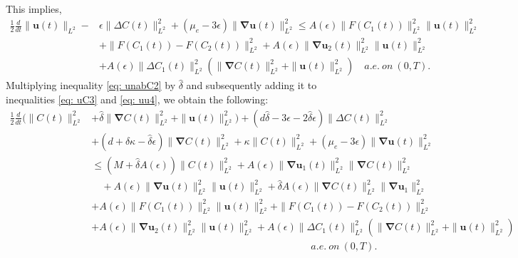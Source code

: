 \documentclass[final,3p,times]{elsarticle}
\theoremstyle{plain}
\theoremstyle{remark}
\theoremstyle{plain}
\theoremstyle{remark}
\begin{document}
This implies,
\begin{align}
      \frac{ 1}{2}\frac{d}{dt}\| \mathbf  u\left(t\right)\|_{L^2}- &\epsilon \|\Delta C\left(t\right)\|_{L^2}^2+\left(\mu _e-3\epsilon\right) \|\boldsymbol{\nabla}\mathbf{u}\left(t\right)\|^2_{L^2}\le A\left(\epsilon\right)\|F\left(C_1\left(t\right)\right)\|^2_{L^2}\|\mathbf u\left(t\right)\|_{L^2}^2\nonumber\\& + 
    \|F\left(C_1\left(t\right)\right)-F\left(C_2\left(t\right)\right)\|^2_{L^2}+A\left(\epsilon\right)\|\boldsymbol{\nabla}\mathbf u_2\left(t\right)\|^2_{L^2}\|\mathbf u\left(t\right)\|^2_{L^2}\nonumber\\&+A\left(\epsilon\right) \|\Delta C_1\left(t\right)\|_{L^2}^2 \left( \|\boldsymbol{\nabla} C\left(t\right)\|_{L^2}^2 + \|\mathbf{u}\left(t\right)\|_{L^2}^2 \right)  \quad a.e.\ on\ \left(0,T\right).\label{eq: uu4}
\end{align}
Multiplying inequality \eqref{eq: unabC2} by $\hat \delta$ and subsequently adding it to inequalities \eqref{eq: uC3} and \eqref{eq: uu4}, we obtain the following:
\begin{align}
\frac{1}{2} \frac{d}{dt} \Big(\|C\left(t\right)\|^2_{L^2} 
       & + \hat \delta\|\boldsymbol{\nabla} C\left(t\right)\|^2_{L^2} + \|\mathbf u\left(t\right)\|_{L^2}^2 \Big) + 
     \left(d \hat \delta -3 \epsilon - 2\hat \delta\epsilon\right)\| \Delta C\left(t\right)\|^2_{L^2} \nonumber \\ 
     & + \left(d+\hat \delta \kappa-\hat \delta \epsilon\right)\|\boldsymbol{\nabla} C\left(t\right)\|^2_{L^2} 
     +\kappa \|C\left(t\right)\|^2_{L^2} + \left(\mu _e-3\epsilon\right) \|\boldsymbol{\nabla}\mathbf{u}\left(t\right)\|^2_{L^2} \nonumber \\ 
     & \le \left(M +\hat \delta A\left(\epsilon\right)\right)\|C\left(t\right)\|^2_{L^2}+A\left(\epsilon\right) \|\boldsymbol{\nabla}\mathbf u_1\left(t\right)\|^2_{L^2} \|\boldsymbol{\nabla} C\left(t\right)\|^2_{L^2} \nonumber\\ 
     & \quad + A\left(\epsilon\right) \|\boldsymbol{\nabla}\mathbf u\left(t\right)\|^2_{L^2} \|\mathbf u\left(t\right)\|^2_{L^2}  +\hat \delta  A\left(\epsilon\right) \|\boldsymbol{\nabla} C\left(t\right)\|^{2}_{L^2} \|\boldsymbol{\nabla} \mathbf u_1\|^{2}_{L^2} \nonumber \\ 
     & + A\left(\epsilon\right)\|F\left(C_1\left(t\right)\right)\|^2_{L^2}\|\mathbf u\left(t\right)\|_{L^2}^2 + \|F\left(C_1\left(t\right)\right)-F\left(C_2\left(t\right)\right)\|^2_{L^2} \nonumber \\ 
     & + A\left(\epsilon\right)\|\boldsymbol{\nabla}\mathbf u_2\left(t\right)\|^2_{L^2}\|\mathbf u\left(t\right)\|^2_{L^2} + A\left(\epsilon\right) \|\Delta C_1\left(t\right)\|_{L^2}^2 \left( \|\boldsymbol{\nabla} C\left(t\right)\|_{L^2}^2 + \|\mathbf{u}\left(t\right)\|_{L^2}^2 \right) \nonumber \\ 
     & \qquad\qquad\qquad\qquad\qquad\qquad\qquad\qquad\qquad\qquad\qquad  a.e.\ on\ \left(0,T\right). \label{eq: uuc1}
\end{align}
\end{document}
